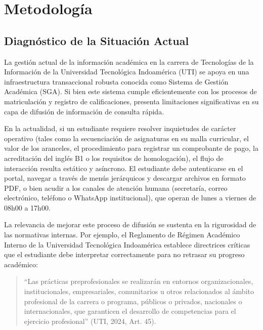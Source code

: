 \chapter{Metodología}
\label{chap:metodologia}

\section{Diagnóstico de la Situación Actual}
\label{sec:diagnostico_ref}
La gestión actual de la información académica en la carrera de Tecnologías de la Información de la Universidad Tecnológica Indoamérica (UTI) se apoya en una infraestructura transaccional robusta conocida como Sistema de Gestión Académica (SGA). Si bien este sistema cumple eficientemente con los procesos de matriculación y registro de calificaciones, presenta limitaciones significativas en su capa de difusión de información de consulta rápida.

En la actualidad, si un estudiante requiere resolver inquietudes de carácter operativo (tales como la secuenciación de asignaturas en su malla curricular, el valor de los aranceles, el procedimiento para registrar un comprobante de pago, la acreditación del inglés B1 o los requisitos de homologación), el flujo de interacción resulta estático y asíncrono. El estudiante debe autenticarse en el portal, navegar a través de menús jerárquicos y descargar archivos en formato PDF, o bien acudir a los canales de atención humana (secretaría, correo electrónico, teléfono o WhatsApp institucional), que operan de lunes a viernes de 08h00 a 17h00.

La relevancia de mejorar este proceso de difusión se sustenta en la rigurosidad de las normativas internas. Por ejemplo, el Reglamento de Régimen Académico Interno de la Universidad Tecnológica Indoamérica establece directrices críticas que el estudiante debe interpretar correctamente para no retrasar su progreso académico:

\begin{quote}
``Las prácticas preprofesionales se realizarán en entornos organizacionales, institucionales, empresariales, comunitarios u otros relacionados al ámbito profesional de la carrera o programa, públicos o privados, nacionales o internacionales, que garanticen el desarrollo de competencias para el ejercicio profesional'' (UTI, 2024, Art. 45).
\end{quote}

